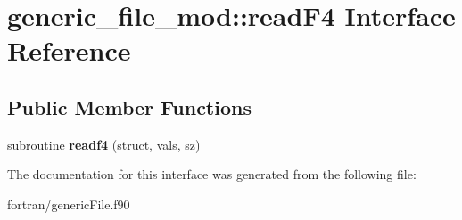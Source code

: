 \hypertarget{interfacegeneric__file__mod_1_1read_f4}{}\section{generic\+\_\+file\+\_\+mod\+:\+:read\+F4 Interface Reference}
\label{interfacegeneric__file__mod_1_1read_f4}
\subsection*{Public Member Functions}
\begin{DoxyCompactItemize}
\item 
\mbox{\label{interfacegeneric__file__mod_1_1read_f4_a552e0b4c579e231d5aec800b7aafedc6}} 
subroutine {\bfseries readf4} (struct, vals, sz)
\end{DoxyCompactItemize}


The documentation for this interface was generated from the following file\+:\begin{DoxyCompactItemize}
\item 
fortran/generic\+File.\+f90\end{DoxyCompactItemize}
